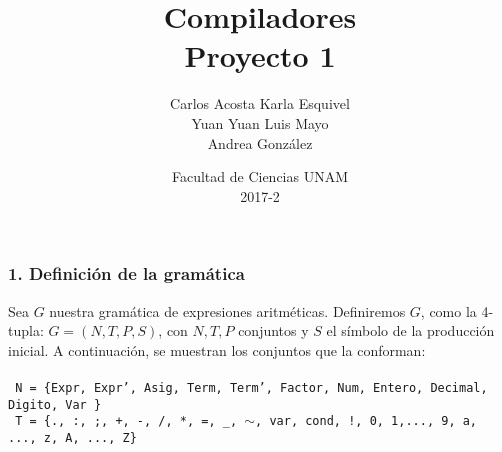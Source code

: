 \documentclass[12pt]{article}
\title{Compiladores\\ Proyecto 1}
\author{Carlos Acosta \qquad Karla Esquivel \\ Yuan Yuan \qquad Luis Mayo \\ Andrea González}
\date{Facultad de Ciencias UNAM \\ 2017-2}
\begin{document}
\maketitle
\subsubsection*{1. Definición de la gramática}

Sea $G$ nuestra gramática de expresiones aritméticas. Definiremos $G$, como la 4-tupla: $G = (N,T,P,S)$, con $N,T,P$ conjuntos y $S$ el símbolo de la producción inicial.
A continuación, se muestran los conjuntos que la conforman:\\ \\
\texttt{ 
N = \{Expr, Expr', Asig, Term, Term', Factor, Num, Entero, Decimal, Digito, Var \}
}\\
\texttt{
T = \{., :, ;, +, -, /, *, =, \_, $\sim$, var, cond, !, 0, 1,..., 9, a, ..., z, A, ..., Z\}
}\\
\end{document}
